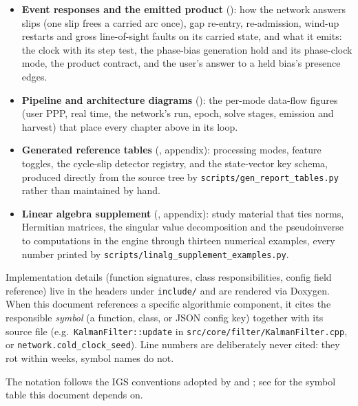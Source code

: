 \documentclass[11pt,letterpaper]{article}
\begin{document}
\begin{itemize}[leftmargin=*]
      the carry the reference configurations use: the carried local
      column and its joint local block, the floored birth prior and the
      bounded drop, the held phase-datum basis, and the exact
      conditional time update of the coupling rows with the temporal
      clock anchor.
\item \textbf{Event responses and the emitted product}
      (): how the network answers slips (one slip
      frees a carried arc once), gap re-entry, re-admission, wind-up
      restarts and gross line-of-sight faults on its carried state, and
      what it emits: the clock with its step test, the phase-bias
      generation hold and its phase-clock mode, the product contract,
      and the user's answer to a held bias's presence edges.
\item \textbf{Pipeline and architecture diagrams} ():
      the per-mode data-flow figures (user PPP, real time, the network's
      run, epoch, solve stages, emission and harvest) that place every
      chapter above in its loop.
\item \textbf{Generated reference tables} (,
      appendix): processing modes, feature toggles, the cycle-slip
      detector registry, and the state-vector key schema, produced
      directly from the source tree by
      \texttt{scripts/gen\_report\_tables.py} rather than maintained by
      hand.
\item \textbf{Linear algebra supplement} (, appendix):
      study material that ties norms, Hermitian matrices, the singular
      value decomposition and the pseudoinverse to computations in the
      engine through thirteen numerical examples, every number printed
      by \texttt{scripts/linalg\_supplement\_examples.py}.
\end{itemize}

Implementation details (function signatures, class responsibilities,
config field reference) live in the headers under \texttt{include/}
and are rendered via Doxygen.  When this document references a
specific algorithmic component, it cites the responsible \emph{symbol}
(a function, class, or JSON config key) together with its source
file (e.g.\ \texttt{KalmanFilter::update} in
\texttt{src/core/filter/KalmanFilter.cpp}, or
\texttt{network.cold\_clock\_seed}).  Line numbers are deliberately
never cited: they rot within weeks, symbol names do not.

The notation follows the IGS conventions adopted by
\textcite{subirana2013gnss} and \textcite{teunissen2017handbook};
see  for the symbol table this document depends on.
\end{document}
